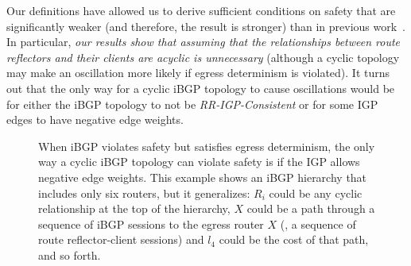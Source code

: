 Our definitions have allowed us to derive sufficient
conditions on safety that are significantly weaker (and therefore, the
result is stronger) than in
previous work~\cite{Griffin2000}.  In particular, {\em our results show
that assuming that the relationships between route reflectors and their
clients are acyclic is unnecessary} (although a cyclic topology may make
an oscillation more likely if egress determinism is
violated).  It turns out that the only way for a cyclic iBGP topology
to cause oscillations would be for either the iBGP topology to not be
{\em RR-IGP-Consistent} or for some IGP edges to have
negative edge weights.

\begin{figure}
\centering
\begin{psfrags}
%
%

\end{psfrags}
\caption[When iBGP satisfies egress determinism,
  a cyclic iBGP topology typically do not cause safety violations.]{When iBGP
  violates safety but satisfies egress determinism, the only way a
  cyclic iBGP topology can 
  violate safety is if the IGP allows negative edge weights.  This
  example shows an iBGP hierarchy that includes only six routers, but it
  generalizes: $R_i$ could be any cyclic relationship at the top of the
  hierarchy, $X$ could be a path through a sequence of iBGP sessions to
  the egress router $X$ (\eg, a sequence of route reflector-client
  sessions) and $l_4$ could be the cost of that path, and so forth.}
\label{fig:ibgp_cycle}
\end{figure}



